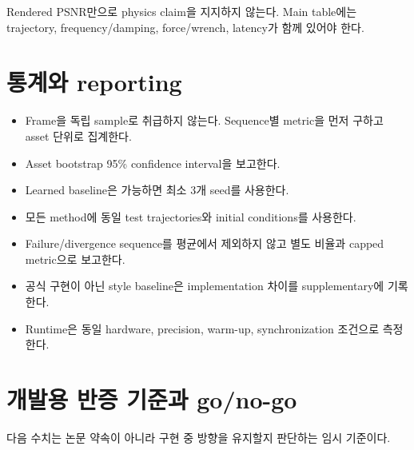 \documentclass[11pt,a4paper]{article}
\begin{document}
Rendered PSNR만으로 physics claim을 지지하지 않는다.
Main table에는 trajectory, frequency/damping, force/wrench, latency가 함께 있어야 한다.

\section{통계와 reporting}

\begin{itemize}[leftmargin=1.5em]
  \item Frame을 독립 sample로 취급하지 않는다.
  Sequence별 metric을 먼저 구하고 asset 단위로 집계한다.
  \item Asset bootstrap 95\% confidence interval을 보고한다.
  \item Learned baseline은 가능하면 최소 3개 seed를 사용한다.
  \item 모든 method에 동일 test trajectories와 initial conditions를 사용한다.
  \item Failure/divergence sequence를 평균에서 제외하지 않고 별도 비율과 capped metric으로 보고한다.
  \item 공식 구현이 아닌 style baseline은 implementation 차이를 supplementary에 기록한다.
  \item Runtime은 동일 hardware, precision, warm-up, synchronization 조건으로 측정한다.
\end{itemize}

\section{개발용 반증 기준과 go/no-go}
\label{sec:development-go-no-go}

다음 수치는 논문 약속이 아니라 구현 중 방향을 유지할지 판단하는 임시 기준이다.
\end{document}

